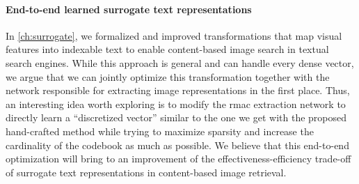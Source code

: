 \paragraph{End-to-end learned surrogate text representations}
In \ref{ch:surrogate}, we formalized and improved transformations that map visual features into indexable text to enable content-based image search in textual search engines.
While this approach is general and can handle every dense vector, we argue that we can jointly optimize this transformation together with the network responsible for extracting image representations in the first place.
Thus, an interesting idea worth exploring is to modify the \gls{rmac} extraction network to directly learn a ``discretized vector'' similar to the one we get with the proposed hand-crafted method while trying to maximize sparsity and increase the cardinality of the codebook as much as possible.
We believe that this end-to-end optimization will bring to an improvement of the effectiveness-efficiency trade-off of surrogate text representations in content-based image retrieval.
